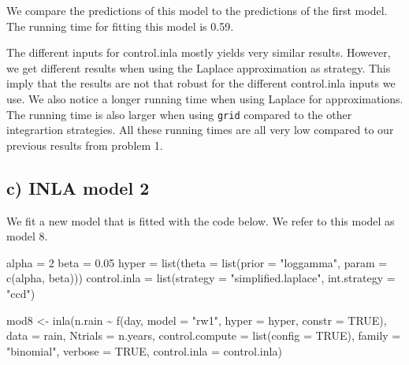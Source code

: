\documentclass[
]{article}
\newenvironment{Shaded}{\begin{snugshade}}{\end{snugshade}}
\newcommand{\AttributeTok}[1]{\textcolor[rgb]{0.77,0.63,0.00}{#1}}
\newcommand{\ConstantTok}[1]{\textcolor[rgb]{0.00,0.00,0.00}{#1}}
\newcommand{\DecValTok}[1]{\textcolor[rgb]{0.00,0.00,0.81}{#1}}
\newcommand{\FloatTok}[1]{\textcolor[rgb]{0.00,0.00,0.81}{#1}}
\newcommand{\FunctionTok}[1]{\textcolor[rgb]{0.00,0.00,0.00}{#1}}
\newcommand{\NormalTok}[1]{#1}
\newcommand{\OtherTok}[1]{\textcolor[rgb]{0.56,0.35,0.01}{#1}}
\newcommand{\SpecialCharTok}[1]{\textcolor[rgb]{0.00,0.00,0.00}{#1}}
\newcommand{\StringTok}[1]{\textcolor[rgb]{0.31,0.60,0.02}{#1}}
\begin{document}
We compare the predictions of this model to the predictions of the first model.
The running time for fitting this model is 0.59.

The different inputs for control.inla mostly yields very similar results. However, we get different results when using the Laplace approximation as strategy. This imply that the results are not that robust for the different control.inla inputs we use. We also notice a longer running time when using Laplace for approximations. The running time is also larger when using \texttt{grid} compared to the other integrartion strategies. All these running times are all very low compared to our previous results from problem 1.

\hypertarget{c-inla-model-2}{%
\subsection{c) INLA model 2}\label{c-inla-model-2}}

We fit a new model that is fitted with the code below. We refer to this model as model 8.

\begin{Shaded}
\begin{Highlighting}[]
\NormalTok{alpha }\OtherTok{=} \DecValTok{2}
\NormalTok{beta }\OtherTok{=} \FloatTok{0.05}
\NormalTok{hyper }\OtherTok{=} \FunctionTok{list}\NormalTok{(}\AttributeTok{theta =} \FunctionTok{list}\NormalTok{(}\AttributeTok{prior =} \StringTok{"loggamma"}\NormalTok{, }\AttributeTok{param =} \FunctionTok{c}\NormalTok{(alpha, beta)))}
\NormalTok{control.inla }\OtherTok{=} \FunctionTok{list}\NormalTok{(}\AttributeTok{strategy =} \StringTok{"simplified.laplace"}\NormalTok{, }\AttributeTok{int.strategy =} \StringTok{"ccd"}\NormalTok{)}

\NormalTok{mod8 }\OtherTok{\textless{}{-}} \FunctionTok{inla}\NormalTok{(n.rain }\SpecialCharTok{\textasciitilde{}} \FunctionTok{f}\NormalTok{(day, }\AttributeTok{model =} \StringTok{"rw1"}\NormalTok{, }\AttributeTok{hyper =}\NormalTok{ hyper, }\AttributeTok{constr =} \ConstantTok{TRUE}\NormalTok{), }\AttributeTok{data =}\NormalTok{ rain,}
    \AttributeTok{Ntrials =}\NormalTok{ n.years, }\AttributeTok{control.compute =} \FunctionTok{list}\NormalTok{(}\AttributeTok{config =} \ConstantTok{TRUE}\NormalTok{), }\AttributeTok{family =} \StringTok{"binomial"}\NormalTok{,}
    \AttributeTok{verbose =} \ConstantTok{TRUE}\NormalTok{, }\AttributeTok{control.inla =}\NormalTok{ control.inla)}
\end{Highlighting}
\end{Shaded}
\end{document}
